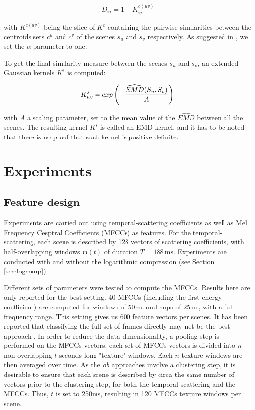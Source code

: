 \documentclass[journal]{IEEEtran}
\begin{document}
\begin{equation*}
D_{ij}=1-K^{c(uv)}_{ij}
\end{equation*}

with $K^{c(uv)}$ being the slice of $K^{c}$ containing the pairwise similarities between the centroids sets $c^u$ and $c^v$ of the scenes $s_u$ and $s_v$ respectively. As suggested in \cite{pele2009fast}, we set the $\alpha$ parameter to one.

To get the final similarity measure between the scenes $s_u$ and $s_v$, an extended Gaussian kernels $K^s$ \cite{chapelle1999support,jing2003support} is computed:

\begin{equation}
\label{eq:ks}
K_{uv}^s = exp\left( - \dfrac{\widehat{EMD}(S_u,S_v)}{A} \right) \\
\end{equation}

with $A$ a scaling parameter, set to the mean value of the $\widehat{EMD}$ between all the scenes. The resulting kernel $K^s$ is called an EMD kernel, and it has to be noted that there is no proof that such kernel is positive definite. \\

\section{Experiments}
\label{sec:experiments}

\subsection{Feature design}

Experiments are carried out using temporal-scattering coefficients as well as Mel Frequency Cesptral Coefficients (MFCCs) as features. For the temporal-scattering, each scene is described by 128 vectors of scattering coefficients, with half-overlapping windows $\boldsymbol{\phi}(t)$ of duration $T=188\,\mathrm{ms}$. Experiments are conducted with and without the logarithmic compression (see Section \ref{sec:logcomp}).

Different sets of parameters were tested to compute the MFCCs. Results here are only reported for the best setting. 40 MFCCs (including the first energy coefficient) are computed for windows of 50ms and hops of 25ms, with a full frequency range. This setting gives us 600 feature vectors per scenes. It has been reported that classifying the full set of frames directly may not be the best approach \cite{rakotomamonjy2015histogram}. In order to reduce the data dimensionality, a pooling step is performed on the MFCCs vectors: each set of MFCCs vectors is divided into $n$ non-overlapping $t$-seconds long "texture" windows. Each $n$ texture windows are then averaged over time. As the \emph{ob} approaches involve a clustering step, it is desirable to ensure that each scene is described by circa the same number of vectors prior to the clustering step, for both the temporal-scattering and the MFCCs. Thus, $t$ is set to 250ms, resulting in 120 MFCCs texture windows per scene. 
\end{document}
